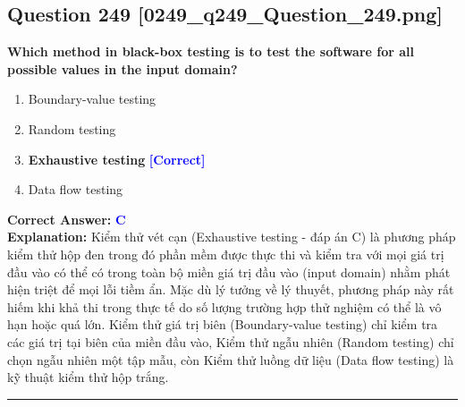 \documentclass[11pt,a4paper]{article}
\begin{document}
\begin{minipage}{\textwidth}
\subsection*{Question 249 \quad \footnotesize{[0249\_q249\_Question\_249.png]}}
\noindent \textbf{Which method in black-box testing is to test the software for all possible values in the input domain?}

\begin{enumerate}[label=\Alph*.]
    \item Boundary-value testing
    \item Random testing
    \item \textbf{Exhaustive testing} \hfill \textcolor{blue}{\textbf{[Correct]}}
    \item Data flow testing
\end{enumerate}

\noindent \textbf{Correct Answer:} \textcolor{blue}{\textbf{C}} \\[2pt]
\noindent \textbf{Explanation:} Kiểm thử vét cạn (Exhaustive testing - đáp án C) là phương pháp kiểm thử hộp đen trong đó phần mềm được thực thi và kiểm tra với mọi giá trị đầu vào có thể có trong toàn bộ miền giá trị đầu vào (input domain) nhằm phát hiện triệt để mọi lỗi tiềm ẩn. Mặc dù lý tưởng về lý thuyết, phương pháp này rất hiếm khi khả thi trong thực tế do số lượng trường hợp thử nghiệm có thể là vô hạn hoặc quá lớn. Kiểm thử giá trị biên (Boundary-value testing) chỉ kiểm tra các giá trị tại biên của miền đầu vào, Kiểm thử ngẫu nhiên (Random testing) chỉ chọn ngẫu nhiên một tập mẫu, còn Kiểm thử luồng dữ liệu (Data flow testing) là kỹ thuật kiểm thử hộp trắng.

\par\vspace{0.3cm}
\hrule
\vspace{0.3cm}
\end{minipage}
\end{document}
